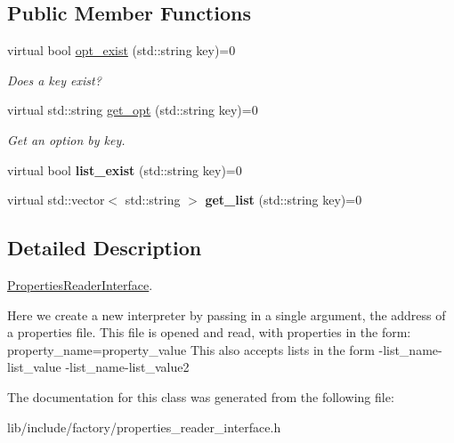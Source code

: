 \subsection*{Public Member Functions}
\begin{DoxyCompactItemize}
\item 
\hypertarget{classPropertiesReaderInterface_a092db49483a5f97b1eb6e2fdca5b97fb}{virtual bool \hyperlink{classPropertiesReaderInterface_a092db49483a5f97b1eb6e2fdca5b97fb}{opt\-\_\-exist} (std\-::string key)=0}\label{classPropertiesReaderInterface_a092db49483a5f97b1eb6e2fdca5b97fb}

\begin{DoxyCompactList}\small\item\em Does a key exist? \end{DoxyCompactList}\item 
\hypertarget{classPropertiesReaderInterface_a16db6a1917d0274811a499b2a270679b}{virtual std\-::string \hyperlink{classPropertiesReaderInterface_a16db6a1917d0274811a499b2a270679b}{get\-\_\-opt} (std\-::string key)=0}\label{classPropertiesReaderInterface_a16db6a1917d0274811a499b2a270679b}

\begin{DoxyCompactList}\small\item\em Get an option by key. \end{DoxyCompactList}\item 
\hypertarget{classPropertiesReaderInterface_ab088ce690f3f96b3f885d762289c23c2}{virtual bool {\bfseries list\-\_\-exist} (std\-::string key)=0}\label{classPropertiesReaderInterface_ab088ce690f3f96b3f885d762289c23c2}

\item 
\hypertarget{classPropertiesReaderInterface_a466f88254dc3f26691e73ba739bdabce}{virtual std\-::vector$<$ std\-::string $>$ {\bfseries get\-\_\-list} (std\-::string key)=0}\label{classPropertiesReaderInterface_a466f88254dc3f26691e73ba739bdabce}

\end{DoxyCompactItemize}


\subsection{Detailed Description}
\hyperlink{classPropertiesReaderInterface}{Properties\-Reader\-Interface}. 

Here we create a new interpreter by passing in a single argument, the address of a properties file. This file is opened and read, with properties in the form\-: property\-\_\-name=property\-\_\-value This also accepts lists in the form -\/list\-\_\-name-\/list\-\_\-value -\/list\-\_\-name-\/list\-\_\-value2 

The documentation for this class was generated from the following file\-:\begin{DoxyCompactItemize}
\item 
lib/include/factory/properties\-\_\-reader\-\_\-interface.\-h\end{DoxyCompactItemize}
